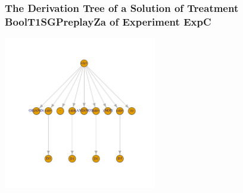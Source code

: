  \begin{frame}
 \frametitle{ The Derivation Tree of a Solution of Treatment BoolT1SGPreplayZa of Experiment ExpC }
 \begin{center}
\includegraphics[width=0.5\textwidth, angle=0]
{ExpCDerivationTreeFigure002.pdf}
 \end{center}
 \label{report/ExpCDerivationTreeFigure002.pdf}  
 \end{frame}

